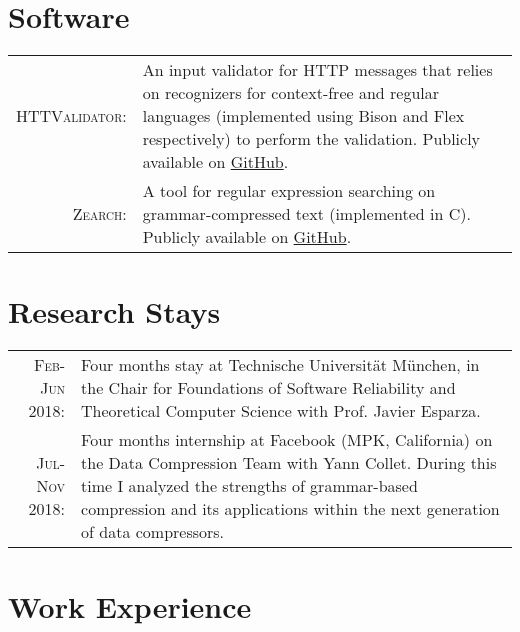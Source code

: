 \documentclass[a4paper,10pt]{article} %
\begin{document}

\section{Software}

\begin{tabular}{rp{11cm}}
\textsc{HTTValidator}: & An input validator for HTTP messages that relies on recognizers for context-free and regular languages (implemented using Bison and Flex respectively) to perform the validation. Publicly available on \href{https://github.com/pevalme/HTTPValidator}{GitHub}. \\

\textsc{Zearch}: & A tool for regular expression searching on grammar-compressed text (implemented in C). Publicly available on \href{https://github.com/pevalme/zearch}{GitHub}.\\
\end{tabular}


\section{Research Stays}

\begin{tabular}{rp{13cm}}
\textsc{Feb-Jun 2018}: & Four months stay at Technische Universität München, in the Chair for Foundations of Software Reliability and Theoretical Computer Science with Prof. Javier Esparza. \\

\textsc{Jul-Nov 2018}: & Four months internship at Facebook (MPK, California) on the Data Compression Team with Yann Collet. During this time I analyzed the strengths of grammar-based compression and its applications within the next generation of data compressors.
\end{tabular}


\section{Work Experience}
\end{document}
